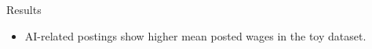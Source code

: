 \begin{frame}{Results}
\begin{itemize}
\item AI-related postings show higher mean posted wages in the toy dataset.
\end{itemize}
\end{frame}
